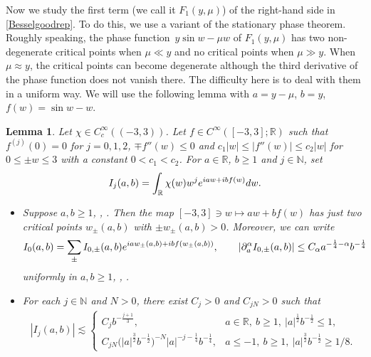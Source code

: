 \documentclass[10pt,a4paper]{article}
\numberwithin{equation}{section}
\newtheorem{Lemma}[Theorem]{Lemma}
\def\R{\mathbb{R}}%
\def\a{\alpha}
\def\m{\mu}
\def\pa{\partial}
\begin{document}
Now we study the first term (we call it $F_1(y,\m)$) of the right-hand side in \eqref{Besselgoodrep}. To do this, we use a variant of the stationary phase theorem. Roughly speaking, the phase function~${y\sin w-\m w}$ of $F_1(y,\m)$ has two non-degenerate critical points when $\m\ll y$ and no critical points when $\m\gg y$. When $\m \approx y$, the critical points can become degenerate although the third derivative of the phase function does not vanish there.
The difficulty here is to deal with them in a uniform way. We will use the following lemma with $a=y-\m$, $b=y$, $f(w)=\sin w-w$.

\begin{Lemma}\label{appstphasevai}
Let $\chi\in C_c^{\infty}((-3,3))$. Let $f\in C^{\infty}([-3,3];\R)$ such that $f^{(j)}(0)=0$ for $j=0,1,2$, $\mp f''(w)\leq 0$ and $c_1|w|\leq |f''(w)|\leq c_2|w|$ for $0\leq \pm w\leq 3$ with a constant $0<c_1<c_2$. For $a\in \R$, $b\geq 1$ and $j\in\mathbb{N}$, set
\begin{align}\label{appI_jdef}
I_j(a,b)=\int_{\R}\chi(w)w^j{\rm e}^{{\rm i}aw+{\rm i}bf(w)}{\rm d}w.
\end{align}

\begin{itemize}\itemsep=0pt
\item[$(i)$] Suppose $a,b\geq 1$, , . Then the map $[-3,3]\ni w\mapsto aw+bf(w)$ has just two critical points $w_{\pm}(a,b)$ with $\pm w_{\pm}(a,b)>0$. Moreover, we can write
\begin{align*}
I_0(a,b)=\sum_{\pm}I_{0,\pm}(a,b){\rm e}^{{\rm i} a w_{\pm}(a,b)+{\rm i}bf(w_{\pm}(a,b))},\qquad |\pa_a^{\a}I_{0,\pm}(a,b)|\leq C_{\a}a^{-\frac{1}{4}-\a}b^{-\frac{1}{4}}
\end{align*}
uniformly in $a,b\geq 1$, , .

\item[$(ii)$] For each $j\in\mathbb{N}$ and $N>0$, there exist $C_j>0$ and $C_{jN}>0$ such that
\begin{align*}
|I_j(a,b)|\lesssim \begin{cases}
C_jb^{-\frac{j+1}{3}}, & a\in \R,\  b\geq 1,\  |a|^{\frac{1}{2}}b^{-\frac{1}{2}}\leq 1, \\
C_{jN}\bigl(|a|^{\frac{3}{2}}b^{-\frac{1}{2}}\bigr)^{-N}|a|^{-j-\frac{1}{4}}b^{-\frac{1}{4}},&  a\leq -1,\  b\geq 1,\
  |a|^{\frac{3}{2}}b^{-\frac{1}{2}}\geq 1/8.
\end{cases}
\end{align*}
\end{itemize}
\end{Lemma}
\end{document}
